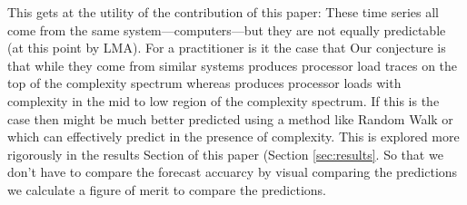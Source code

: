 This gets at the utility of the contribution of this paper: These time series all come from the same system---computers---but they are not equally predictable (at this point by LMA). For a practitioner is it the case that 
  Our
conjecture is that while they come from similar systems \gcc produces processor load traces on the top of the complexity spectrum whereas \col produces processor loads with complexity in the mid to low region of the complexity spectrum. If this is the case then \gcc might be much better predicted using a method like Random Walk or \naive which can effectively predict in the presence of complexity. This is explored more rigorously in the results Section of this paper (Section \ref{sec:results}. So that we don't have to compare the forecast accuarcy by visual comparing the predictions we calculate a figure of merit to compare the predictions. 






